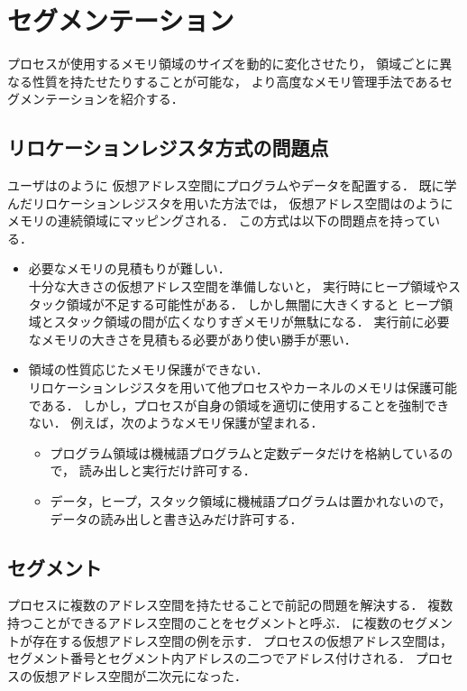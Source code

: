 \chapter{セグメンテーション}
\label{chap:segmentation}
プロセスが使用するメモリ領域のサイズを動的に変化させたり，
領域ごとに異なる性質を持たせたりすることが可能な，
より高度なメモリ管理手法であるセグメンテーションを紹介する．

\section{リロケーションレジスタ方式の問題点}
ユーザはのように
仮想アドレス空間にプログラムやデータを配置する．
既に学んだリロケーションレジスタを用いた方法では，
仮想アドレス空間はのように
メモリの連続領域にマッピングされる．
この方式は以下の問題点を持っている．

\begin{itemize}
\item 必要なメモリの見積もりが難しい．\\
十分な大きさの仮想アドレス空間を準備しないと，
実行時にヒープ領域やスタック領域が不足する可能性がある．
しかし無闇に大きくすると
ヒープ領域とスタック領域の間が広くなりすぎメモリが無駄になる．
実行前に必要なメモリの大きさを見積もる必要があり使い勝手が悪い．

\item 領域の性質応じたメモリ保護ができない．\\
リロケーションレジスタを用いて他プロセスやカーネルのメモリは保護可能である．
しかし，プロセスが自身の領域を適切に使用することを強制できない．
例えば，次のようなメモリ保護が望まれる．

\begin{itemize}
\item プログラム領域は機械語プログラムと定数データだけを格納しているので，
読み出しと実行だけ許可する．
\item データ，ヒープ，スタック領域に機械語プログラムは置かれないので，
データの読み出しと書き込みだけ許可する．
\end{itemize}
\end{itemize}

\section{セグメント}
プロセスに複数のアドレス空間を持たせることで前記の問題を解決する．
複数持つことができるアドレス空間のことをセグメントと呼ぶ．
に複数のセグメントが存在する仮想アドレス空間の例を示す．
プロセスの仮想アドレス空間は，
セグメント番号とセグメント内アドレスの二つでアドレス付けされる．
プロセスの仮想アドレス空間が二次元になった．

